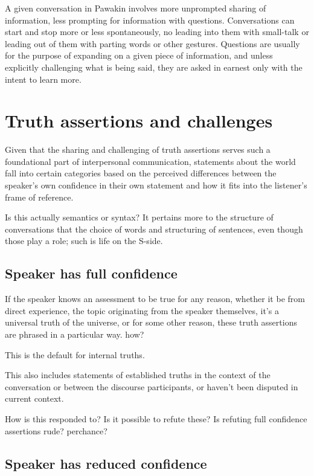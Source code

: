 \documentclass[smallroyalvopaper,9pt]{memoir} %
\newcommand{\langeng}{Pawakin}
\begin{document}
A given conversation in \langeng{} involves more unprompted sharing of information, less prompting for information with questions. Conversations can start and stop more or less spontaneously, no leading into them with small-talk or leading out of them with parting words or other gestures. Questions are usually for the purpose of expanding on a given piece of information, and unless explicitly challenging what is being said, they are asked in earnest only with the intent to learn more. 

\section{Truth assertions and challenges}

Given that the sharing and challenging of truth assertions serves such a foundational part of interpersonal communication, statements about the world fall into certain categories based on the perceived differences between the speaker's own confidence in their own statement and how it fits into the listener's frame of reference. 

Is this actually semantics or syntax? It pertains more to the structure of conversations that the choice of words and structuring of sentences, even though those play a role; such is life on the S-side.

\subsection{Speaker has full confidence}

If the speaker knows an assessment to be true for any reason, whether it be from direct experience, the topic originating from the speaker themselves, it's a universal truth of the universe, or for some other reason, these truth assertions are phrased in a particular way. how? 

This is the default for internal truths.

This also includes statements of established truths in the context of the conversation or between the discourse participants, or haven't been disputed in current context.

How is this responded to? Is it possible to refute these? Is refuting full confidence assertions rude? perchance?

\subsection{Speaker has reduced confidence}
\end{document}
